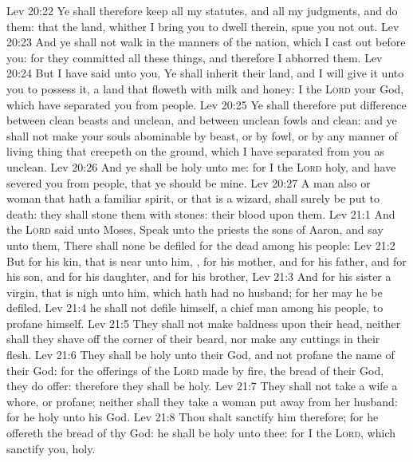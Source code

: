 \vs Lev 20:22 Ye shall therefore keep all my statutes, and all my judgments, and do them: that the land, whither I bring you to dwell therein, spue you not out.
\vs Lev 20:23 And ye shall not walk in the manners of the nation, which I cast out before you: for they committed all these things, and therefore I abhorred them.
\vs Lev 20:24 But I have said unto you, Ye shall inherit their land, and I will give it unto you to possess it, a land that floweth with milk and honey: I  the \textsc{Lord} your God, which have separated you from  people.
\vs Lev 20:25 Ye shall therefore put difference between clean beasts and unclean, and between unclean fowls and clean: and ye shall not make your souls abominable by beast, or by fowl, or by any manner of living thing that creepeth on the ground, which I have separated from you as unclean.
\vs Lev 20:26 And ye shall be holy unto me: for I the \textsc{Lord}  holy, and have severed you from  people, that ye should be mine.
\vs Lev 20:27 A man also or woman that hath a familiar spirit, or that is a wizard, shall surely be put to death: they shall stone them with stones: their blood  upon them.
\vs Lev 21:1 And the \textsc{Lord} said unto Moses, Speak unto the priests the sons of Aaron, and say unto them, There shall none be defiled for the dead among his people:
\vs Lev 21:2 But for his kin, that is near unto him, , for his mother, and for his father, and for his son, and for his daughter, and for his brother,
\vs Lev 21:3 And for his sister a virgin, that is nigh unto him, which hath had no husband; for her may he be defiled.
\vs Lev 21:4  he shall not defile himself,  a chief man among his people, to profane himself.
\vs Lev 21:5 They shall not make baldness upon their head, neither shall they shave off the corner of their beard, nor make any cuttings in their flesh.
\vs Lev 21:6 They shall be holy unto their God, and not profane the name of their God: for the offerings of the \textsc{Lord} made by fire,  the bread of their God, they do offer: therefore they shall be holy.
\vs Lev 21:7 They shall not take a wife  a whore, or profane; neither shall they take a woman put away from her husband: for he  holy unto his God.
\vs Lev 21:8 Thou shalt sanctify him therefore; for he offereth the bread of thy God: he shall be holy unto thee: for I the \textsc{Lord}, which sanctify you,  holy.
